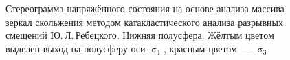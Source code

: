\begin{figure}[H]
\begin{changemargin}{0cm}{0cm}
\begin{center}
\begin{minipage}[h]{0.33\linewidth}
        \caption{Стереограмма напряжённого состояния на основе
    анализа массива зеркал скольжения методом катакластического анализа разрывных смещений Ю.\,Л.\,Ребецкого.
    Нижняя полусфера. Жёлтым цветом выделен выход на полусферу оси $\upsigma_1$, красным цветом~--- $\upsigma_3$}
        \label{fig:kondratev-fig3}
    \end{minipage}


  \end{center}
\end{changemargin}

\end{figure}
